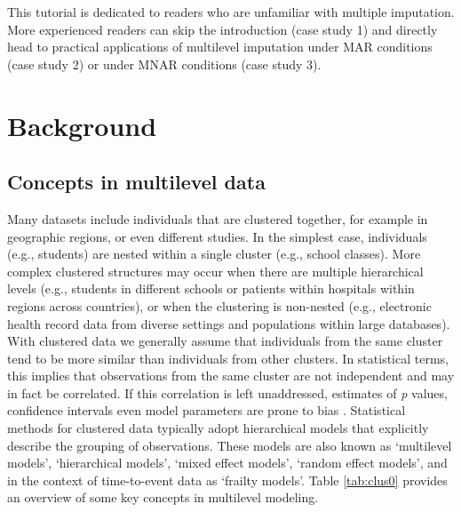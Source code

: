 \documentclass[
  article]{jss}
\begin{document}
This tutorial is dedicated to readers who are unfamiliar with multiple
imputation. More experienced readers can skip the introduction (case
study 1) and directly head to practical applications of multilevel
imputation under MAR conditions (case study 2) or under MNAR conditions
(case study 3).

\hypertarget{sec-models}{%
\section{Background}\label{sec-models}}

\hypertarget{concepts-in-multilevel-data}{%
\subsection{Concepts in multilevel
data}\label{concepts-in-multilevel-data}}

Many datasets include individuals that are clustered together, for
example in geographic regions, or even different studies. In the
simplest case, individuals (e.g., students) are nested within a single
cluster (e.g., school classes). More complex clustered structures may
occur when there are multiple hierarchical levels (e.g., students in
different schools or patients within hospitals within regions across
countries), or when the clustering is non-nested (e.g., electronic
health record data from diverse settings and populations within large
databases). With clustered data we generally assume that individuals
from the same cluster tend to be more similar than individuals from
other clusters. In statistical terms, this implies that observations
from the same cluster are not independent and may in fact be correlated.
If this correlation is left unaddressed, estimates of \emph{p} values,
confidence intervals even model parameters are prone to bias
\citep{loca01}. Statistical methods for clustered data typically adopt
hierarchical models that explicitly describe the grouping of
observations. These models are also known as `multilevel models',
`hierarchical models', `mixed effect models', `random effect models',
and in the context of time-to-event data as `frailty models'. Table
\ref{tab:clus0} provides an overview of some key concepts in multilevel
modeling.
\end{document}
